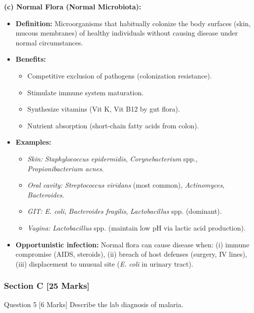 \documentclass[11pt,a4paper]{article}
\begin{document}
\begin{ansbox}
\textbf{(c) Normal Flora (Normal Microbiota):}
\begin{itemize}[leftmargin=*]
    \item \textbf{Definition:} Microorganisms that habitually colonize the body surfaces (skin, mucous membranes) of healthy individuals without causing disease under normal circumstances.
    \item \textbf{Benefits:}
    \begin{itemize}
        \item Competitive exclusion of pathogens (colonization resistance).
        \item Stimulate immune system maturation.
        \item Synthesize vitamins (Vit K, Vit B12 by gut flora).
        \item Nutrient absorption (short-chain fatty acids from colon).
    \end{itemize}
    \item \textbf{Examples:}
    \begin{itemize}
        \item \textit{Skin:} \textit{Staphylococcus epidermidis}, \textit{Corynebacterium} spp., \textit{Propionibacterium acnes}.
        \item \textit{Oral cavity:} \textit{Streptococcus viridans} (most common), \textit{Actinomyces}, \textit{Bacteroides}.
        \item \textit{GIT:} \textit{E. coli}, \textit{Bacteroides fragilis}, \textit{Lactobacillus} spp. (dominant).
        \item \textit{Vagina:} \textit{Lactobacillus} spp. (maintain low pH via lactic acid production).
    \end{itemize}
    \item \textbf{Opportunistic infection:} Normal flora can cause disease when: (i) immune compromise (AIDS, steroids), (ii) breach of host defenses (surgery, IV lines), (iii) displacement to unusual site (\textit{E. coli} in urinary tract).
\end{itemize}
\end{ansbox}

\subsubsection{Section C [25 Marks]}

\begin{qbox}{Question 5 [6 Marks]}
Describe the lab diagnosis of malaria.
\end{qbox}
\end{document}
